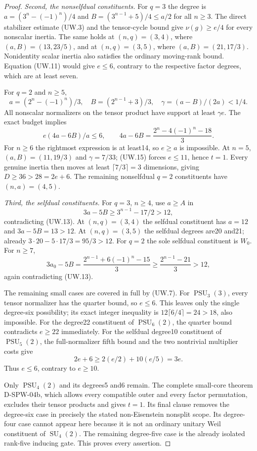 \begin{proof}
\emph{Second, the nonselfdual constituents.}
For $q=3$ the degree is $a=(3^n-(-1)^n)/4$ and
$B=(3^{n-1}+5)/4\le a/2$ for all $n\ge3$.
The direct stabilizer estimate (UW.3) and the tensor-cycle
bound give $\nu(g)\ge e/4$ for every nonscalar inertia.
The same holds at $(n,q)=(3,4)$, where $(a,B)=(13,23/5)$,
and at $(n,q)=(3,5)$, where $(a,B)=(21,17/3)$.
Nonidentity scalar inertia also satisfies the ordinary
moving-rank bound. Equation (UW.11) would give $e\le6$,
contrary to the respective factor degrees, which are at least seven.

For $q=2$ and $n\ge5$,
\[
 a=(2^n-(-1)^n)/3,\quad B=(2^{n-1}+3)/3,\quad
 \gamma=(a-B)/(2a)<1/4.
\]
All nonscalar normalizers on the tensor product have support
at least $\gamma e$. The exact budget implies
\[
 e(4a-6B)/a\le6,\qquad
        4a-6B=\frac{2^n-4(-1)^n-18}{3}.                    \tag{UW.15}
\]
For $n\ge6$ the rightmost expression is at least14, so
$e\ge a$ is impossible. At $n=5$, $(a,B)=(11,19/3)$
and $\gamma=7/33$; (UW.15) forces $e\le11$, hence $t=1$.
Every genuine inertia then moves at least $\lceil7/3\rceil=3$
dimensions, giving $D\ge36>28=2e+6$. The remaining
nonselfdual $q=2$ constituents have $(n,a)=(4,5)$.

\emph{Third, the selfdual constituents.}
For $q=3$, $n\ge4$, use $a\ge A$ in
\[
                    3a-5B\ge3^{n-1}-17/2>12,
\]
contradicting (UW.13). At $(n,q)=(3,4)$ the selfdual
constituent has $a=12$ and $3a-5B=13>12$.
At $(n,q)=(3,5)$ the selfdual degrees are20 and21;
already $3\cdot20-5\cdot17/3=95/3>12$.
For $q=2$ the sole selfdual constituent is $W_0$.
For $n\ge7$,
\[
 3a_0-5B=\frac{2^{n-1}+6(-1)^n-15}{3}
                   \ge\frac{2^{n-1}-21}{3}>12,
\]
again contradicting (UW.13).

The remaining small cases are covered in full by (UW.7).
For $\operatorname{PSU}_3(3)$, every tensor normalizer has
the quarter bound, so $e\le6$. This leaves only the single
degree-six possibility; its exact integer inequality is
$12\lceil6/4\rceil=24>18$, also impossible.
For the degree22 constituent of $\operatorname{PSU}_6(2)$,
the quarter bound contradicts $e\ge22$ immediately.
For the selfdual degree10 constituent of $\operatorname{PSU}_5(2)$,
the full-normalizer fifth bound and the two nontrivial
multiplier costs give
\[
                   2e+6\ge2(e/2)+10(e/5)=3e.
\]
Thus $e\le6$, contrary to $e\ge10$.

Only $\operatorname{PSU}_4(2)$ and its degrees5 and6 remain.
The complete small-core theorem D-SPW-04b, which allows
every compatible outer and every factor permutation,
excludes their tensor products and gives $t=1$.
Its final clause removes the degree-six case in precisely
the stated non-Eisenstein nonsplit scope. Its degree-four
case cannot appear here because it is not an ordinary
unitary Weil constituent of $\operatorname{SU}_4(2)$.
The remaining degree-five case is the already isolated
rank-five inducing gate. This proves every assertion.
\end{proof}

